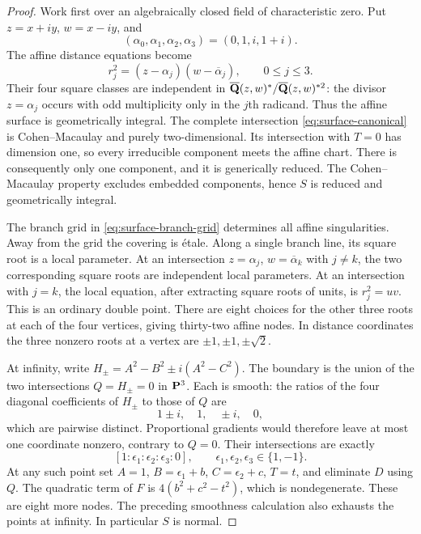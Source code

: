 \begin{proof}
Work first over an algebraically closed field of characteristic zero.
Put $z=x+iy$, $w=x-iy$, and
\[
 (\alpha_0,\alpha_1,\alpha_2,\alpha_3)=(0,1,i,1+i).
\]
The affine distance equations become
\begin{equation}\label{eq:surface-branch-grid}
 r_j^2=(z-\alpha_j)(w-\overline\alpha_j),\qquad 0\le j\le3.
\end{equation}
Their four square classes are independent in
$\overline{\mathbf Q}(z,w)^*/\overline{\mathbf Q}(z,w)^{*2}$: the divisor
$z=\alpha_j$ occurs with odd multiplicity only in the $j$th radicand.
Thus the affine surface is geometrically integral.  The complete
intersection \eqref{eq:surface-canonical} is Cohen--Macaulay and purely
two-dimensional. Its intersection with $T=0$ has dimension one, so every
irreducible component meets the affine chart. There is consequently only
one component, and it is generically reduced. The Cohen--Macaulay property
excludes embedded components, hence $S$ is reduced and geometrically integral.

The branch grid in \eqref{eq:surface-branch-grid} determines all affine
singularities.  Away from the grid the covering is \'etale.  Along a
single branch line, its square root is a local parameter.  At an
intersection $z=\alpha_j$, $w=\overline\alpha_k$ with $j\ne k$, the two
corresponding square roots are independent local parameters.  At an
intersection with $j=k$, the local equation, after extracting square
roots of units, is $r_j^2=uv$.  This is an ordinary double point.
There are eight choices for the other three roots at each of the four
vertices, giving thirty-two affine nodes.  In distance coordinates the
three nonzero roots at a vertex are $\pm1,\pm1,\pm\sqrt2$.

At infinity, write $H_\pm=A^2-B^2\pm i(A^2-C^2)$.  The boundary is
the union of the two intersections $Q=H_\pm=0$ in $\mathbf P^3$.  Each is
smooth: the ratios of the four diagonal coefficients of $H_\pm$ to
those of $Q$ are
\[
 1\pm i,\quad 1,\quad \pm i,\quad 0,
\]
which are pairwise distinct.  Proportional gradients would therefore
leave at most one coordinate nonzero, contrary to $Q=0$.  Their
intersections are exactly
\begin{equation}\label{eq:surface-infinity-nodes}
 [1:\epsilon_1:\epsilon_2:\epsilon_3:0],
 \qquad \epsilon_1,\epsilon_2,\epsilon_3\in\{1,-1\}.
\end{equation}
At any such point set $A=1$, $B=\epsilon_1+b$,
$C=\epsilon_2+c$, $T=t$, and eliminate $D$ using $Q$.
The quadratic term of $F$ is $4(b^2+c^2-t^2)$, which is nondegenerate.
These are eight more nodes.  The preceding smoothness calculation
also exhausts the points at infinity.  In particular $S$ is normal.


\end{proof}
